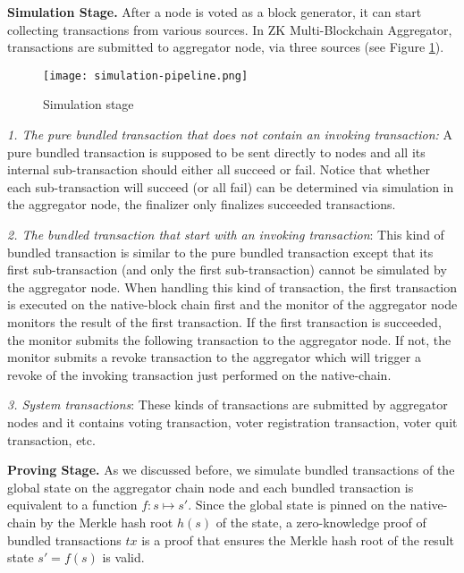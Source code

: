 \smallskip\noindent\textbf{Simulation Stage.}
After a node is voted as a block generator, it can start collecting transactions from various sources. In ZK Multi-Blockchain Aggregator, transactions are submitted to aggregator node, via three sources (see Figure \ref{simulation-stage}).

\begin{figure}[!ht]
\begin{center}
\texttt{[image: simulation-pipeline.png]}
\end{center}
\caption{Simulation stage}
\label{simulation-stage}
\end{figure}

\noindent\textit{1. The pure bundled transaction that does not contain an invoking transaction:} A pure bundled transaction is supposed to be sent directly to \dprotocol nodes and all its internal sub-transaction should either all succeed or fail. Notice that whether each sub-transaction will succeed (or all fail) can be determined via simulation in the aggregator node, the finalizer only finalizes succeeded transactions.

\noindent\textit{2. The bundled transaction that start with an invoking transaction}: This kind of bundled transaction is similar to the pure bundled transaction except that its first sub-transaction (and only the first sub-transaction) cannot be simulated by the aggregator node. When handling this kind of transaction, the first transaction is executed on the native-block chain first and the monitor of the aggregator node monitors the result of the first transaction. If the first transaction is succeeded, the monitor submits the following transaction to the aggregator node. If not, the monitor submits a revoke transaction to the aggregator which will trigger a revoke of the invoking transaction just performed on the native-chain.

\noindent\textit{3. System transactions}: These kinds of transactions are submitted by aggregator nodes and it contains voting transaction, voter registration transaction, voter quit transaction, etc.

\smallskip\noindent\textbf{Proving Stage.}
As we discussed before, we simulate bundled transactions of the global state on the aggregator chain node and each bundled transaction is equivalent to a function $f: s \mapsto s'$. Since the global state is pinned on the native-chain by the Merkle hash root $h(s)$ of the state, a zero-knowledge proof of bundled transactions $tx$ is a proof that ensures the Merkle hash root of the result state $s' = f(s)$ is valid. 

